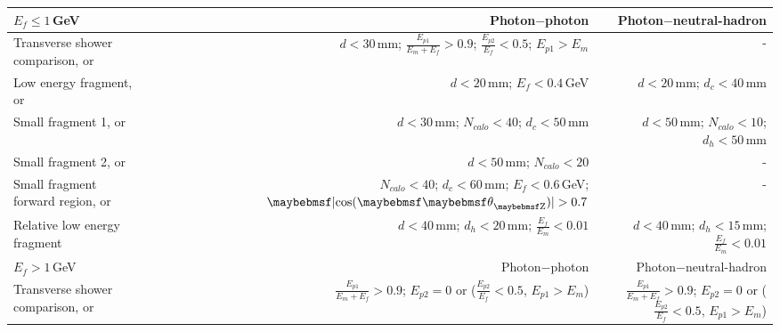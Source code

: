 \begin{table}[htbp]
\centering

\smallskip

\begin{tabular}{l  r  r }
\hline
\hline
$E_f\leqslant1$\,GeV &  Photon$-$photon & Photon$-$neutral-hadron \\
\hline
\multicolumn{1}{L{0.3\textwidth}}{Transverse shower comparison, or} & \multicolumn{1}{R{0.3\textwidth}}{$d < 30 $\,mm; $\frac{E_{p1}}{E_m + E_f} > 0.9 $; $\frac{E_{p2}}{E_f} < 0.5 $; $E_{p1} > E_m$}  & \multicolumn{1}{R{0.3\textwidth}}{-} \\
\multicolumn{1}{L{0.3\textwidth}}{Low energy fragment, or} & \multicolumn{1}{R{0.3\textwidth}}{$d < 20 $\,mm; $E_f < 0.4 $\,GeV}  & \multicolumn{1}{R{0.3\textwidth}}{$d < 20 $\,mm; $d_c < 40 $\,mm} \\
\multicolumn{1}{L{0.3\textwidth}}{Small fragment 1, or} & \multicolumn{1}{R{0.3\textwidth}}{$d < 30 $\,mm; $N_{calo} < 40 $; $d_c < 50 $\,mm}  & \multicolumn{1}{R{0.3\textwidth}}{$d < 50 $\,mm; $N_{calo} < 10 $; $d_h < 50$\,mm} \\
\multicolumn{1}{L{0.3\textwidth}}{Small fragment 2, or} & \multicolumn{1}{R{0.3\textwidth}}{$d < 50 $\,mm; $N_{calo} < 20 $}  & \multicolumn{1}{R{0.3\textwidth}}{-} \\
\multicolumn{1}{L{0.3\textwidth}}{Small fragment forward region, or} & \multicolumn{1}{R{0.3\textwidth}}{$N_{calo} < 40$; $d_c < 60$\,mm; $E_f < 0.6$\,GeV; $\absCosTheta > 0.7$}  & \multicolumn{1}{R{0.3\textwidth}}{-} \\
\multicolumn{1}{L{0.3\textwidth}}{Relative low energy fragment} & \multicolumn{1}{R{0.3\textwidth}}{$d < 40$\,mm; $d_h < 20$\,mm; $\frac{E_{f}}{E_m} < 0.01$}  & \multicolumn{1}{R{0.3\textwidth}}{$d < 40$\,mm; $d_h < 15$\,mm; $\frac{E_{f}}{E_m} < 0.01$} \\
\hline
$E_f>1$\,GeV &  Photon$-$photon & Photon$-$neutral-hadron \\
\hline
\multicolumn{1}{L{0.3\textwidth}}{Transverse shower comparison, or} & \multicolumn{1}{R{0.3\textwidth}}{$\frac{E_{p1}}{E_m + E_f} > 0.9 $; $E_{p2} = 0$ or ($\frac{E_{p2}}{E_f} < 0.5 $, $E_{p1} > E_m$)}  & \multicolumn{1}{R{0.3\textwidth}}{$\frac{E_{p1}}{E_m + E_f} > 0.9 $; $E_{p2} = 0$ or ($\frac{E_{p2}}{E_f} < 0.5 $, $E_{p1} > E_m$)} \\

\end{tabular}
\end{table}
